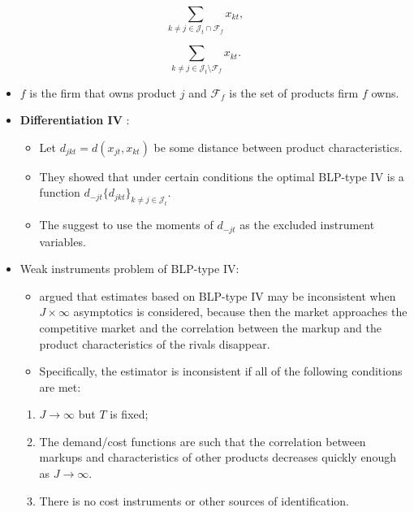 \documentclass[]{book}
\providecommand{\tightlist}{%
  \setlength{\itemsep}{0pt}\setlength{\parskip}{0pt}}
\begin{document}
\begin{equation}
\sum_{k \neq j \in \mathcal{J}_t \cap \mathcal{F}_{f}} x_{kt},
\end{equation}

\begin{equation}
\sum_{k \neq j \in \mathcal{J}_t \setminus \mathcal{F}_{f}} x_{kt}.
\end{equation}

\begin{itemize}
\tightlist
\item
  \(f\) is the firm that owns product \(j\) and \(\mathcal{F}_{f}\) is
  the set of products firm \(f\) owns.
\item
  \textbf{Differentiation IV} \citep{Gandhi2015a}:

  \begin{itemize}
  \tightlist
  \item
    Let \(d_{jkt} = d(x_{jt}, x_{kt})\) be some distance between product
    characteristics.
  \item
    They showed that under certain conditions the optimal BLP-type IV is
    a function \(d_{-jt}\{d_{jkt}\}_{k \neq j \in \mathcal{J}_t}\).
  \item
    The suggest to use the moments of \(d_{-jt}\) as the excluded
    instrument variables.
  \end{itemize}
\item
  Weak instruments problem of BLP-type IV:

  \begin{itemize}
  \tightlist
  \item
    \citet{Armstrong2016b} argued that estimates based on BLP-type IV
    may be inconsistent when \(J \times \infty\) asymptotics is
    considered, because then the market approaches the competitive
    market and the correlation between the markup and the product
    characteristics of the rivals disappear.
  \item
    Specifically, the estimator is inconsistent if all of the following
    conditions are met:
  \end{itemize}

  \begin{enumerate}
  \def\labelenumi{\arabic{enumi}.}
  \tightlist
  \item
    \(J \to \infty\) but \(T\) is fixed;
  \item
    The demand/cost functions are such that the correlation between
    markups and characteristics of other products decreases quickly
    enough as \(J \to \infty\).
  \item
    There is no cost instruments or other sources of identification.
  \end{enumerate}
\end{itemize}
\end{document}
